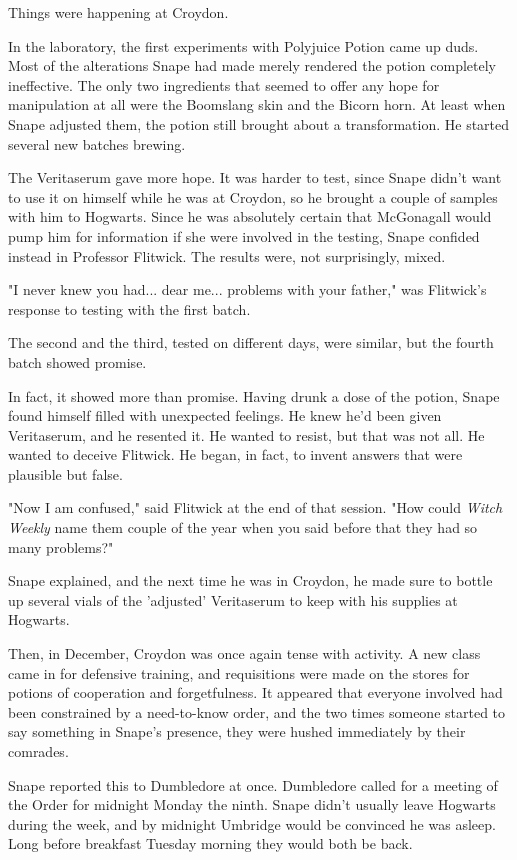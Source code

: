 \documentclass[a4paper,11pt]{article}
\begin{document}
Things were happening at Croydon.

In the laboratory, the first experiments with Polyjuice Potion came up duds. Most of the alterations Snape had made merely rendered the potion completely ineffective. The only two ingredients that seemed to offer any hope for manipulation at all were the Boomslang skin and the Bicorn horn. At least when Snape adjusted them, the potion still brought about a transformation. He started several new batches brewing.

The Veritaserum gave more hope. It was harder to test, since Snape didn't want to use it on himself while he was at Croydon, so he brought a couple of samples with him to Hogwarts. Since he was absolutely certain that McGonagall would pump him for information if she were involved in the testing, Snape confided instead in Professor Flitwick. The results were, not surprisingly, mixed.

"I never knew you had... dear me... problems with your father," was Flitwick's response to testing with the first batch.

The second and the third, tested on different days, were similar, but the fourth batch showed promise.

In fact, it showed more than promise. Having drunk a dose of the potion, Snape found himself filled with unexpected feelings. He knew he'd been given Veritaserum, and he resented it. He wanted to resist, but that was not all. He wanted to deceive Flitwick. He began, in fact, to invent answers that were plausible but false.

"Now I am confused," said Flitwick at the end of that session. "How could \emph{Witch Weekly} name them couple of the year when you said before that they had so many problems?"

Snape explained, and the next time he was in Croydon, he made sure to bottle up several vials of the 'adjusted' Veritaserum to keep with his supplies at Hogwarts.

Then, in December, Croydon was once again tense with activity. A new class came in for defensive training, and requisitions were made on the stores for potions of cooperation and forgetfulness. It appeared that everyone involved had been constrained by a need-to-know order, and the two times someone started to say something in Snape's presence, they were hushed immediately by their comrades.

Snape reported this to Dumbledore at once. Dumbledore called for a meeting of the Order for midnight Monday the ninth. Snape didn't usually leave Hogwarts during the week, and by midnight Umbridge would be convinced he was asleep. Long before breakfast Tuesday morning they would both be back.
\end{document}
